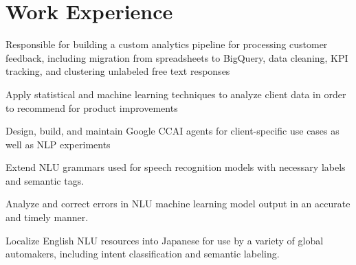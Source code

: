 \documentclass[letterpaper]{deedy-resume_sm} %
\begin{document}

\lastupdated %


\section{Work Experience}
\begin{tightitemize}
\item Responsible for building a custom analytics pipeline for processing customer feedback, including migration from spreadsheets to BigQuery, data cleaning, KPI tracking, and clustering unlabeled free text responses
\item Apply statistical and machine learning techniques to analyze client data in order to recommend for product improvements
\item Design, build, and maintain Google CCAI agents for client-specific use cases as well as NLP experiments
\end{tightitemize}
\begin{tightitemize}
\item Extend NLU grammars used for speech recognition models with necessary labels and semantic tags.
\item Analyze and correct errors in NLU machine learning model output in an accurate and timely manner.
\item Localize English NLU resources into Japanese for use by a variety of global automakers, including intent classification and semantic labeling.   
\end{tightitemize}
\end{document}
